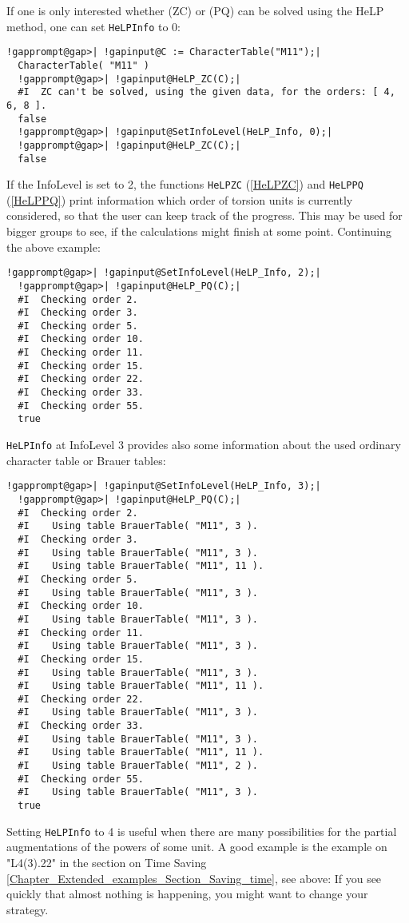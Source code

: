 \documentclass[a4paper,11pt]{report}
\begin{document}
{{ If one is only interested whether (ZC) or (PQ) can be solved using the HeLP
method, one can set \texttt{HeLP{\textunderscore}Info} to 0: 
\begin{Verbatim}[commandchars=!@|,fontsize=\small,frame=single,label=Example]
  !gapprompt@gap>| !gapinput@C := CharacterTable("M11");|
  CharacterTable( "M11" )
  !gapprompt@gap>| !gapinput@HeLP_ZC(C);|
  #I  ZC can't be solved, using the given data, for the orders: [ 4, 6, 8 ].
  false
  !gapprompt@gap>| !gapinput@SetInfoLevel(HeLP_Info, 0);|
  !gapprompt@gap>| !gapinput@HeLP_ZC(C);|
  false
\end{Verbatim}
 If the InfoLevel is set to 2, the functions \texttt{HeLP{\textunderscore}ZC} (\ref{HeLPZC}) and \texttt{HeLP{\textunderscore}PQ} (\ref{HeLPPQ}) print information which order of torsion units is currently considered, so
that the user can keep track of the progress. This may be used for bigger
groups to see, if the calculations might finish at some point. Continuing the
above example: 
\begin{Verbatim}[commandchars=!@|,fontsize=\small,frame=single,label=Example]
  !gapprompt@gap>| !gapinput@SetInfoLevel(HeLP_Info, 2);|
  !gapprompt@gap>| !gapinput@HeLP_PQ(C);|
  #I  Checking order 2.
  #I  Checking order 3.
  #I  Checking order 5.
  #I  Checking order 10.
  #I  Checking order 11.
  #I  Checking order 15.
  #I  Checking order 22.
  #I  Checking order 33.
  #I  Checking order 55.
  true
\end{Verbatim}
 \texttt{HeLP{\textunderscore}Info} at InfoLevel 3 provides also some information about the used ordinary
character table or Brauer tables: 
\begin{Verbatim}[commandchars=!@|,fontsize=\small,frame=single,label=Example]
  !gapprompt@gap>| !gapinput@SetInfoLevel(HeLP_Info, 3);|
  !gapprompt@gap>| !gapinput@HeLP_PQ(C);|
  #I  Checking order 2.
  #I    Using table BrauerTable( "M11", 3 ).
  #I  Checking order 3.
  #I    Using table BrauerTable( "M11", 3 ).
  #I    Using table BrauerTable( "M11", 11 ).
  #I  Checking order 5.
  #I    Using table BrauerTable( "M11", 3 ).
  #I  Checking order 10.
  #I    Using table BrauerTable( "M11", 3 ).
  #I  Checking order 11.
  #I    Using table BrauerTable( "M11", 3 ).
  #I  Checking order 15.
  #I    Using table BrauerTable( "M11", 3 ).
  #I    Using table BrauerTable( "M11", 11 ).
  #I  Checking order 22.
  #I    Using table BrauerTable( "M11", 3 ).
  #I  Checking order 33.
  #I    Using table BrauerTable( "M11", 3 ).
  #I    Using table BrauerTable( "M11", 11 ).
  #I    Using table BrauerTable( "M11", 2 ).
  #I  Checking order 55.
  #I    Using table BrauerTable( "M11", 3 ).
  true
\end{Verbatim}
 Setting \texttt{HeLP{\textunderscore}Info} to 4 is useful when there are many possibilities for the partial augmentations
of the powers of some unit. A good example is the example on
"L4(3).2\texttt{}2" in the section on Time Saving \ref{Chapter_Extended_examples_Section_Saving_time}, see above: If you see quickly that almost nothing is happening, you might
want to change your strategy.

}}
\end{document}
